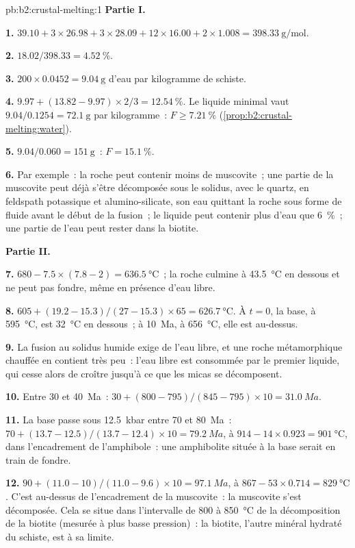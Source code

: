 \begin{solution}{pb:b2:crustal-melting:1}
\noindent\textbf{Partie I.}

\textbf{1.} $39.10 + 3\times26.98 + 3\times28.09 + 12\times16.00 + 2\times1.008 =
\qty{398.33}{\gram\per\mole}$.

\textbf{2.} $18.02/398.33 = \qty{4.52}{\percent}$.

\textbf{3.} $200\times0.0452 = \qty{9.04}{\gram}$ d'eau par kilogramme de schiste.

\textbf{4.} $9.97 + (13.82 - 9.97)\times2/3 = \qty{12.54}{\percent}$. Le liquide minimal vaut
$9.04/0.1254 = \qty{72.1}{\gram}$ par kilogramme~: $F \ge \qty{7.21}{\percent}$
(\cref{prop:b2:crustal-melting:water}).

\textbf{5.} $9.04/0.060 = \qty{151}{\gram}$~: $F = \qty{15.1}{\percent}$.

\textbf{6.} Par exemple~: la roche peut contenir moins de muscovite~; une partie de la muscovite peut
déjà s'être décomposée sous le solidus, avec le quartz, en feldspath potassique et alumino-silicate,
son eau quittant la roche sous forme de fluide avant le début de la fusion~; le liquide peut contenir plus d'eau
que \qty{6}{\percent}~; une partie de l'eau peut rester dans la biotite.

\noindent\textbf{Partie II.}

\textbf{7.} $680 - 7.5\times(7.8 - 2) = \qty{636.5}{\celsius}$~; la roche culmine
à \qty{43.5}{\celsius} en dessous et ne peut pas fondre, même en présence d'eau libre.

\textbf{8.} $605 + (19.2 - 15.3)/(27 - 15.3)\times65 = \qty{626.7}{\celsius}$. À
$t = 0$, la base, à \qty{595}{\celsius}, est \qty{32}{\celsius} en dessous~; à
\qty{10}{Ma}, à \qty{656}{\celsius}, elle est au-dessus.

\textbf{9.} La fusion au solidus humide exige de l'eau libre, et une roche métamorphique chauffée
en contient très peu~: l'eau libre est consommée par le premier liquide, qui cesse alors de croître
jusqu'à ce que les micas se décomposent.

\textbf{10.} Entre 30 et \qty{40}{Ma}~: $30 + (800 - 795)/(845 - 795)\times10 =
\qty{31.0}{Ma}$.

\textbf{11.} La base passe sous \qty{12.5}{kbar} entre 70 et \qty{80}{Ma}~:
$70 + (13.7 - 12.5)/(13.7 - 12.4)\times10 = \qty{79.2}{Ma}$, à
$914 - 14\times0.923 = \qty{901}{\celsius}$, dans l'encadrement de l'amphibole~: une amphibolite
située à la base serait en train de fondre.

\textbf{12.} $90 + (11.0 - 10)/(11.0 - 9.6)\times10 = \qty{97.1}{Ma}$, à $867 -
53\times0.714 = \qty{829}{\celsius}$. C'est au-dessus de l'encadrement de la muscovite~:
la muscovite s'est décomposée. Cela se situe dans l'intervalle de 800 à \qty{850}{\celsius} de la décomposition de la biotite
(mesurée à plus basse pression)~: la biotite, l'autre minéral hydraté du schiste, est à sa
limite.


\end{solution}
